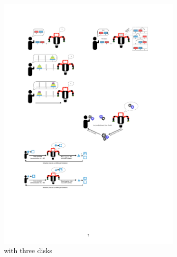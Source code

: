 \begin{figure}[htp]
	\centering
	\begin{subfigure}[t]{0.45\textwidth}
		\includegraphics[width=\textwidth]{figures/hanoi-0}
		\caption{with three disks}		
		\label{fig:Tower of Hanoi 3}
	\end{subfigure}\hfill
\begin{subfigure}[t]{0.45\textwidth}

\end{subfigure}
\end{figure}
